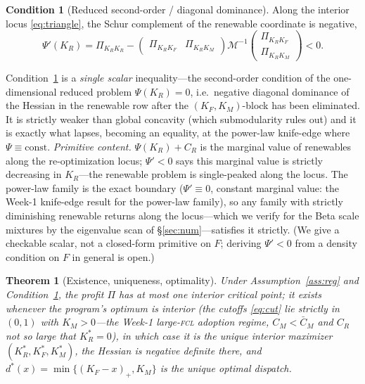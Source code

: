 \documentclass[11pt,reqno]{amsart}
\theoremstyle{plain}
\newtheorem{theorem}{Theorem}
\theoremstyle{definition}
\newtheorem{condition}{Condition}
\theoremstyle{remark}
\newcommand{\KR}{K_R}
\newcommand{\KF}{K_F}
\newcommand{\KM}{K_M}
\newcommand{\KRs}{K_R^{*}}
\newcommand{\KFs}{K_F^{*}}
\newcommand{\KMs}{K_M^{*}}
\newcommand{\CM}{C_M}
\newcommand{\CR}{C_R}
\newcommand{\CMbar}{\bar C_M}
\begin{document}
\begin{condition}[Reduced second-order / diagonal dominance]\label{cond:schur}
Along the interior locus \eqref{eq:triangle}, the Schur complement of the renewable
coordinate is negative,
\begin{equation}\label{eq:schur}
  \Psi'(\KR)=\Pi_{\KR\KR}-\begin{pmatrix}\Pi_{\KR\KF}&\Pi_{\KR\KM}\end{pmatrix}
  \mathcal M^{-1}\begin{pmatrix}\Pi_{\KR\KF}\\ \Pi_{\KR\KM}\end{pmatrix}<0 .
\end{equation}
\end{condition}

Condition~\ref{cond:schur} is a \emph{single scalar} inequality---the
second-order condition of the one-dimensional reduced problem $\Psi(\KR)=0$,
i.e.\ negative diagonal dominance of the Hessian in the renewable row after the
$(\KF,\KM)$-block has been eliminated. It is strictly weaker than global
concavity (which submodularity rules out) and it is exactly what lapses, becoming
an equality, at the power-law knife-edge where $\Psi\equiv\text{const}$.
\emph{Primitive content.} $\Psi(\KR)+\CR$ is the marginal value of renewables along
the re-optimization locus; $\Psi'<0$ says this marginal value is strictly
decreasing in $\KR$---the renewable problem is single-peaked along the locus. The
power-law family is the exact boundary ($\Psi'\equiv0$, constant marginal value:
the Week-1 knife-edge result for the power-law family), so any family with strictly diminishing
renewable returns along the locus---which we verify for the Beta scale mixtures by
the eigenvalue scan of \S\ref{sec:num}---satisfies it strictly. (We give a
checkable scalar, not a closed-form primitive on $F$; deriving $\Psi'<0$ from a
density condition on $F$ in general is open.)

\begin{theorem}[Existence, uniqueness, optimality]\label{thm:unique}
Under Assumption~\ref{ass:reg} and Condition~\ref{cond:schur}, the profit $\Pi$
has \emph{at most one} interior critical point; it exists whenever the program's
optimum is interior (the cutoffs \eqref{eq:cut} lie strictly in $(0,1)$ with
$\KM>0$---the Week-1 large-\textsc{fcl} adoption regime, $\CM<\CMbar$ and $\CR$ not
so large that $\KRs=0$), in which case it is the \emph{unique} interior maximizer
$(\KRs,\KFs,\KMs)$, the Hessian is negative definite there, and
$d^{*}(x)=\min\{(\KF-x)_+,\KM\}$ is the unique optimal dispatch.
\end{theorem}
\end{document}
